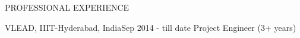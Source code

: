 \documentclass{resume} %
\begin{document}
\break
\begin{rSection}{PROFESSIONAL EXPERIENCE}

   \begin{rSubsection}
    {VLEAD, IIIT-Hyderabad, India}{Sep 2014 - till date}
    {Project Engineer} {(3+ years)}

      



      
      

      

\end{rSubsection}
\end{rSection}
\end{document}
